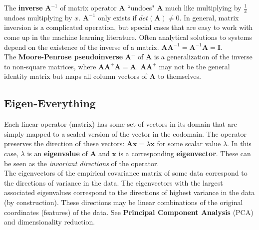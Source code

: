 \documentclass{harvardml}
\theoremstyle{definition}
\theoremstyle{plain}
\begin{document}
		\noindent The \textbf{inverse} $\mathbf{A}^{-1}$ of matrix operator 
		$\mathbf{A}$ ``undoes" $\mathbf{A}$ much like multiplying by 
        $\frac{1}{x}$ undoes multiplying by $x$. $\mathbf{A}^{-1}$ 
        only exists if $det(\mathbf{A}) \neq 0$. In general, matrix 
        inversion is a complicated operation, but special cases that 
        are easy to work with come up in the machine learning literature. 
        Often analytical solutions to systems depend on the existence of 
        the inverse of a matrix. $\mathbf{A}\mathbf{A}^{-1} = 
        \mathbf{A}^{-1}\mathbf{A} = \mathbf{I}$.\\
		
		\noindent The \textbf{Moore-Penrose pseudoinverse} $\mathbf{A}^+$ of 
        $\mathbf{A}$ is a generalization of the inverse to 
        non-square matrices, where $\mathbf{A}\mathbf{A}^+\mathbf{A} 
        = \mathbf{A}$. $\mathbf{A}\mathbf{A}^+$ may not be the general 
    	identity matrix but maps all column vectors of $\mathbf{A}$ to 
        themselves.

    \subsection{Eigen-Everything}
        Each linear operator (matrix) has some set of vectors in its domain
        that are simply mapped to a scaled version of the vector
        in the codomain. The operator preserves the direction of these vectors:
        $\mathbf{Ax} = \lambda\mathbf{x}$ for some scalar value $\lambda$. 
        In this case, $\lambda$ is an \textbf{eigenvalue} of $\mathbf{A}$ and 
        $\mathbf{x}$ is a corresponding \textbf{eigenvector}. These can be seen
        as the \textit{invariant directions} of the operator.\\

    	\noindent The eigenvectors of the empirical covariance 
        matrix of some data correspond to the directions
        of variance in the data. The eigenvectors with the
        largest associated eigenvalues correspond to the directions
        of highest variance in the data (by construction). 
		These directions may be linear combinations of the original 
		coordinates (features) of the data. See 
		\textbf{Principal Component Analysis} (PCA) 
        and dimensionality reduction.\\
                  
\end{document}
